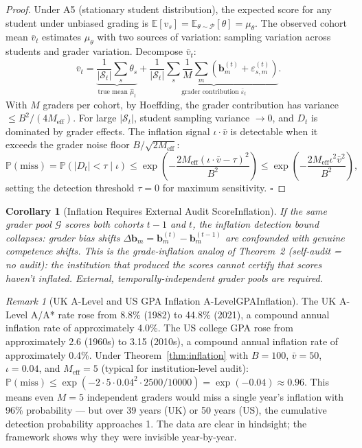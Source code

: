 \documentclass[11pt,a4paper]{article}
\newtheorem{corollary}[theorem]{Corollary}
\theoremstyle{definition}
\theoremstyle{remark}
\newtheorem{remark}[theorem]{Remark}
\newcommand{\E}{\mathbb{E}}
\newcommand{\Pbb}{\mathbb{P}}
\newcommand{\cG}{\mathcal{G}}
\newcommand{\cP}{\mathcal{P}}
\newcommand{\cS}{\mathcal{S}}
\newcommand{\studentSet}{\cS}
\newcommand{\trueScore}{\theta}
\newcommand{\inflationRate}{\iota}
\newcommand{\biasVec}{\mathbf{b}}
\begin{document}
\begin{proof}
Under A5 (stationary student distribution), the expected score for any student under unbiased grading is $\E[v_s] = \E_{\trueScore \sim \cP}[\trueScore] = \mu_\trueScore$. The observed cohort mean $\bar{v}_t$ estimates $\mu_\trueScore$ with two sources of variation: sampling variation across students and grader variation.
Decompose $\bar{v}_t$:
\begin{equation}
    \bar{v}_t = \underbrace{\frac{1}{|\studentSet_t|}\sum_{s} \trueScore_s}_{\text{true mean } \hat{\mu}_t} + \underbrace{\frac{1}{|\studentSet_t|}\sum_{s} \frac{1}{M}\sum_{m} (\biasVec_m^{(t)} + \varepsilon_{s,m}^{(t)})}_{\text{grader contribution } \bar{\varepsilon}_t}.
\end{equation}
With $M$ graders per cohort, by Hoeffding, the grader contribution has variance $\le B^2/(4 M_{\text{eff}})$. For large $|\studentSet_t|$, student sampling variance $\to 0$, and $D_t$ is dominated by grader effects. The inflation signal $\inflationRate \cdot \bar{v}$ is detectable when it exceeds the grader noise floor $B/\sqrt{2 M_{\text{eff}}}$:
\begin{equation}
    \Pbb(\text{miss}) = \Pbb(|D_t| < \tau \mid \inflationRate) \le \exp\left(-\frac{2 M_{\text{eff}} (\inflationRate \cdot \bar{v} - \tau)^2}{B^2}\right) \le \exp\left(-\frac{2 M_{\text{eff}} \inflationRate^2 \bar{v}^2}{B^2}\right),
\end{equation}
setting the detection threshold $\tau = 0$ for maximum sensitivity. \hfill $\square$
\end{proof}
\begin{corollary}[Inflation Requires External Audit ScoreInflation]
\label{cor:inflation_external}
If the same grader pool $\cG$ scores both cohorts $t-1$ and $t$, the inflation detection bound collapses: grader bias shifts $\Delta \biasVec_m = \biasVec_m^{(t)} - \biasVec_m^{(t-1)}$ are confounded with genuine competence shifts. This is the grade-inflation analog of Theorem~2 (self-audit = no audit): the institution that produced the scores cannot certify that scores haven't inflated. External, temporally-independent grader pools are required.
\end{corollary}
\begin{remark}[UK A-Level and US GPA Inflation A-LevelGPAInflation]
The UK A-Level A/A* rate rose from 8.8\% (1982) to 44.8\% (2021), a compound annual inflation rate of approximately 4.0\%. The US college GPA rose from approximately 2.6 (1960s) to 3.15 (2010s), a compound annual inflation rate of approximately 0.4\%. Under Theorem~\ref{thm:inflation} with $B=100$, $\bar{v}=50$, $\inflationRate=0.04$, and $M_{\text{eff}}=5$ (typical for institution-level audit): $\Pbb(\text{miss}) \le \exp(-2 \cdot 5 \cdot 0.04^2 \cdot 2500 / 10000) = \exp(-0.04) \approx 0.96$. This means even $M=5$ independent graders would miss a single year's inflation with 96\% probability — but over 39 years (UK) or 50 years (US), the cumulative detection probability approaches 1. The data are clear in hindsight; the framework shows why they were invisible year-by-year.
\end{remark}
\end{document}
